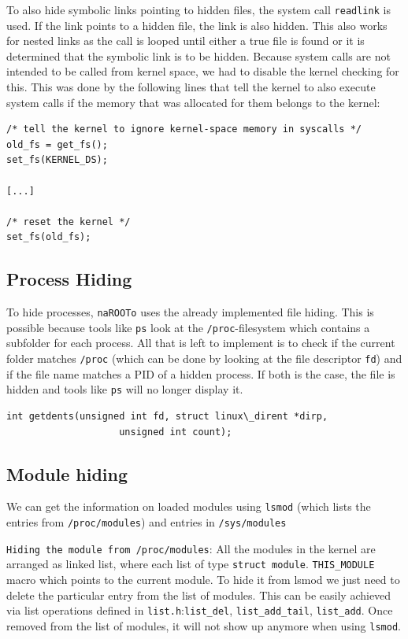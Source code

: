\documentclass[10pt, letterpaper]{scrartcl}
\begin{document}
To also hide symbolic links pointing to hidden files, the system call \texttt{readlink} is used.
If the link points to a hidden file, the link is also hidden.
This also works for nested links as the call is looped until either a true file is found or it is determined that the symbolic link is to be hidden.
Because system calls are not intended to be called from kernel space, we had to disable the kernel checking for this.
This was done by the following lines that tell the kernel to also execute system calls if the memory that was allocated for them belongs to the kernel:

\begin{verbatim}
/* tell the kernel to ignore kernel-space memory in syscalls */
old_fs = get_fs();
set_fs(KERNEL_DS);

[...]
	
/* reset the kernel */
set_fs(old_fs);
\end{verbatim}

\subsection{Process Hiding}
To hide processes, \texttt{naROOTo} uses the already implemented file hiding.
This is possible because tools like \texttt{ps} look at the \texttt{/proc}-filesystem which contains a subfolder for each process.
All that is left to implement is to check if the current folder matches \texttt{/proc} (which can be done by looking at the file descriptor \texttt{fd}) and if the file name matches a PID of a hidden process. If both is the case, the file is hidden and tools like \texttt{ps} will no longer display it.

\begin{verbatim}
int getdents(unsigned int fd, struct linux\_dirent *dirp,
                    unsigned int count);
\end{verbatim}

\subsection{Module hiding}
We can get the information on loaded modules using \texttt{lsmod}
(which lists the entries from \texttt{/proc/modules}) and entries in \texttt{/sys/modules}

\texttt{Hiding the module from /proc/modules}: All the modules in the kernel are arranged as linked list, 
where each list of type \texttt{struct module}. \texttt{THIS\_MODULE} macro which points to the current module. 
To hide it from lsmod we just need to delete the particular entry from the list of modules. 
This can be easily achieved via list operations defined in \texttt{list.h}:\texttt{list\_del}, 
\texttt{list\_add\_tail}, \texttt{list\_add}. Once removed from the list of modules, 
it will not show up anymore when using \texttt{lsmod}. 
\end{document}

